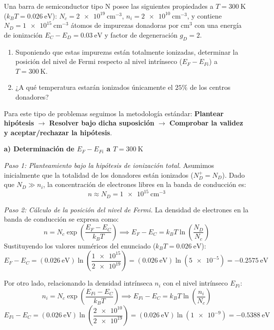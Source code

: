 \newpage
\begin{problema}
Una barra de semiconductor tipo N posee las siguientes propiedades a $T = \SI{300}{\kelvin}$ ($k_B T = \SI{0.026}{\eV}$): $N_c = \SI{2e19}{\cm^{-3}}$, $n_i = \SI{2e10}{\cm^{-3}}$, y contiene $N_D = \SI{1e15}{\cm^{-3}}$ átomos de impurezas donadoras por $\text{cm}^3$ con una energía de ionización $E_C - E_D = \SI{0.03}{\eV}$ y factor de degeneración $g_D = 2$.

\begin{enumerate}[label=\alph*)]
    \item Suponiendo que estas impurezas están totalmente ionizadas, determinar la posición del nivel de Fermi respecto al nivel intrínseco ($E_F - E_{Fi}$) a $T = \SI{300}{\kelvin}$.
    \item ¿A qué temperatura estarán ionizados únicamente el $25\%$ de los centros donadores?
\end{enumerate}

\tcblower

Para este tipo de problemas seguimos la metodología estándar: \textbf{Plantear hipótesis} $\to$ \textbf{Resolver bajo dicha suposición} $\to$ \textbf{Comprobar la validez y aceptar/rechazar la hipótesis}.

\textbf{a) Determinación de $E_F - E_{Fi}$ a $T = \SI{300}{\kelvin}$}

\textit{Paso 1: Planteamiento bajo la hipótesis de ionización total.}
Asumimos inicialmente que la totalidad de los donadores están ionizados ($N_D^+ = N_D$). Dado que $N_D \gg n_i$, la concentración de electrones libres en la banda de conducción es:
\[
n \approx N_D = \SI{1e15}{\cm^{-3}}
\]

\textit{Paso 2: Cálculo de la posición del nivel de Fermi.}
La densidad de electrones en la banda de conducción se expresa como:
\[
n = N_c \exp\left( \frac{E_F - E_C}{k_B T} \right) \implies E_F - E_C = k_B T \ln\left( \frac{N_D}{N_c} \right)
\]
Sustituyendo los valores numéricos del enunciado ($k_B T = \SI{0.026}{\eV}$):
\[
E_F - E_C = (\SI{0.026}{\eV}) \ln\left( \frac{\num{1e15}}{\num{2e19}} \right) = (\SI{0.026}{\eV}) \ln(\num{5e-5}) = \SI{-0.2575}{\eV}
\]

Por otro lado, relacionando la densidad intrínseca $n_i$ con el nivel intrínseco $E_{Fi}$:
\[
n_i = N_c \exp\left( \frac{E_{Fi} - E_C}{k_B T} \right) \implies E_{Fi} - E_C = k_B T \ln\left( \frac{n_i}{N_c} \right)
\]
\[
E_{Fi} - E_C = (\SI{0.026}{\eV}) \ln\left( \frac{\num{2e10}}{\num{2e19}} \right) = (\SI{0.026}{\eV}) \ln(\num{1e-9}) = \SI{-0.5388}{\eV}
\]


\end{problema}
